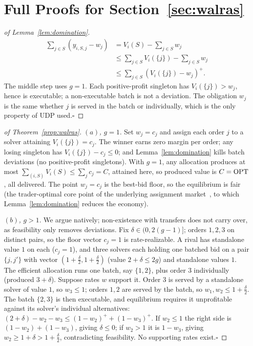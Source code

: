 \section{Full Proofs for Section~\ref{sec:walras}}

\begin{proof}[of Lemma~\ref{lem:domination}]
\[
\begin{aligned}
\sum_{j\in S}(y_{i,S,j}-w_j)
&=V_i(S)-\sum_{j\in S}w_j\\
&\le \sum_{j\in S}V_i(\{j\})-\sum_{j\in S}w_j\\
&\le \sum_{j\in S}(V_i(\{j\})-w_j)^+ .
\end{aligned}
\]
The middle step uses $g=1$. Each
positive-profit singleton has $V_i(\{j\})>w_j$, hence is executable; a
non-executable batch is not a deviation. The obligation $w_j$ is the same
whether $j$ is served in the batch or individually, which is the only
property of UDP used.\hfill$\square$
\end{proof}

\begin{proof}[of Theorem~\ref{prop:walras}]
\emph{$(a)$, $g=1$.} Set $w_j=c_j$ and assign each order $j$ to a solver
attaining $V_i(\{j\})=c_j$. The winner earns zero margin per order; any
losing singleton has $V_i(\{j\})-c_j\le0$; and
Lemma~\ref{lem:domination} kills batch deviations (no positive-profit
singletons). With $g=1$, any allocation produces at most
$\sum_{(i,S)}V_i(S)\le\sum_j c_j=C$, attained here, so produced value is
$C=\mathrm{OPT}$, all delivered. The point $w_j=c_j$ is the best-bid floor, so
the equilibrium is fair (the trader-optimal core point of the underlying
assignment market~\cite{shapley1971}, to which
Lemma~\ref{lem:domination} reduces the economy).

\emph{$(b)$, $g>1$.} We argue natively; non-existence with transfers does
not carry over, as feasibility only removes deviations. Fix
$\delta\in(0,2(g-1)]$; orders $1,2,3$ on distinct pairs, so the floor
vector $c_j=1$ is rate-realizable. A rival has
standalone value $1$ on each ($c_j=1$), and three solvers each holding
one batched bid on a pair $\{j,j'\}$ with vector
$(1+\tfrac\delta2,1+\tfrac\delta2)$ (value $2+\delta\le2g$) and
standalone values $1$. The efficient allocation runs one batch, say
$\{1,2\}$, plus order $3$ individually (produced $3+\delta$). Suppose
rates $w$ support it. Order $3$ is served by a standalone solver of value
$1$, so $w_3\le1$; orders $1,2$ are served by the batch, so
$w_1,w_2\le1+\tfrac\delta2$. The batch $\{2,3\}$ is then executable, and
equilibrium requires it unprofitable against its solver's individual
alternatives: $(2+\delta)-w_2-w_3\le(1-w_2)^++(1-w_3)^+$. If $w_2\le1$
the right side is $(1-w_2)+(1-w_3)$, giving $\delta\le0$; if $w_2>1$ it
is $1-w_3$, giving $w_2\ge1+\delta>1+\tfrac\delta2$, contradicting
feasibility. No supporting rates exist.\hfill$\square$
\end{proof}

